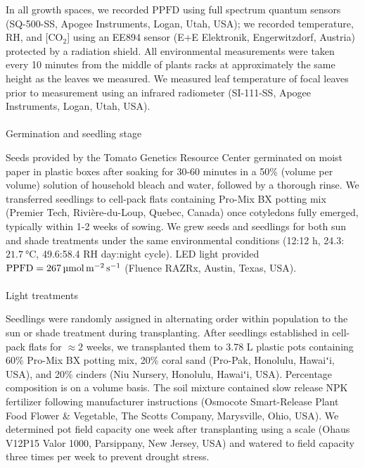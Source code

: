 \documentclass[
  letterpaper,
  DIV=11,
  numbers=noendperiod]{scrartcl}
\makeatletter
\let\oldparagraph\paragraph
\renewcommand{\paragraph}{
    \@ifstar
      \xxxParagraphStar
      \xxxParagraphNoStar
  }
\newcommand{\xxxParagraphStar}[1]{\oldparagraph*{#1}\mbox{}}
\newcommand{\xxxParagraphNoStar}[1]{\oldparagraph{#1}\mbox{}}
\makeatother
\begin{document}
In all growth spaces, we recorded \(\mathrm{PPFD}\) using full spectrum
quantum sensors (SQ-500-SS, Apogee Instruments, Logan, Utah, USA); we
recorded temperature, RH, and {[}CO\(_2\){]} using an EE894 sensor (E+E
Elektronik, Engerwitzdorf, Austria) protected by a radiation shield. All
environmental measurements were taken every 10 minutes from the middle
of plants racks at approximately the same height as the leaves we
measured. We measured leaf temperature of focal leaves prior to
measurement using an infrared radiometer (SI-111-SS, Apogee Instruments,
Logan, Utah, USA).

\paragraph{Germination and seedling
stage}\label{germination-and-seedling-stage}

Seeds provided by the Tomato Genetics Resource Center germinated on
moist paper in plastic boxes after soaking for 30-60 minutes in a 50\%
(volume per volume) solution of household bleach and water, followed by
a thorough rinse. We transferred seedlings to cell-pack flats containing
Pro-Mix BX potting mix (Premier Tech, Rivière-du-Loup, Quebec, Canada)
once cotyledons fully emerged, typically within 1-2 weeks of sowing. We
grew seeds and seedlings for both sun and shade treatments under the
same environmental conditions (12:12 h,
24.3:\(\qty{21.7}{\degreeCelsius}\), 49.6:58.4 RH day:night cycle). LED
light provided
\(\mathrm{PPFD} = \qty{267}{\micro\mol\raiseto{-2}\meter\raiseto{-1}\second}\)
(Fluence RAZRx, Austin, Texas, USA).

\paragraph{Light treatments}\label{light-treatments}

Seedlings were randomly assigned in alternating order within population
to the sun or shade treatment during transplanting. After seedlings
established in cell-pack flats for \(\approx 2\) weeks, we transplanted
them to 3.78 L plastic pots containing 60\% Pro-Mix BX potting mix, 20\%
coral sand (Pro-Pak, Honolulu, Hawaiʻi, USA), and 20\% cinders (Niu
Nursery, Honolulu, Hawaiʻi, USA). Percentage composition is on a volume
basis. The soil mixture contained slow release NPK fertilizer following
manufacturer instructions (Osmocote Smart-Release Plant Food Flower \&
Vegetable, The Scotts Company, Marysville, Ohio, USA). We determined pot
field capacity one week after transplanting using a scale (Ohaus V12P15
Valor 1000, Parsippany, New Jersey, USA) and watered to field capacity
three times per week to prevent drought stress.
\end{document}
